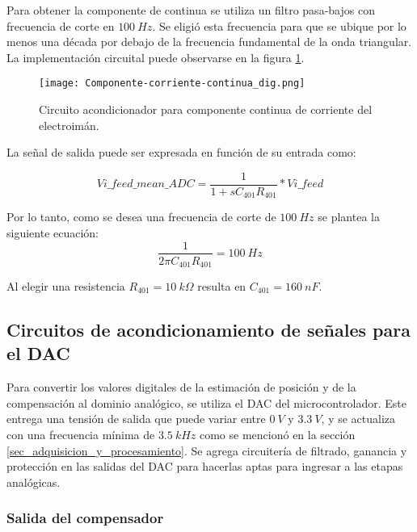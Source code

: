  Para obtener la componente de continua se utiliza un filtro pasa-bajos con frecuencia de corte en $100\:Hz$. Se eligió esta frecuencia para que se ubique por lo menos una década por debajo de la frecuencia fundamental de la onda triangular. La implementación circuital puede observarse en la figura \ref{fig:componente-corriente-continua}.


\begin{figure}[H]
	\centering
	\texttt{[image: Componente-corriente-continua\_dig.png]}
	\caption{Circuito acondicionador para componente continua de corriente del electroimán.
	}
	\label{fig:componente-corriente-continua}
\end{figure}

La señal de salida puede ser expresada en función de su entrada como:

\begin{equation*}
	Vi\_feed\_mean\_ADC=\frac{1}{1+sC_{401}R_{401}}*Vi\_feed
\end{equation*}

Por lo tanto, como se desea una frecuencia de corte de $100\:Hz$ se plantea la siguiente ecuación:
\begin{equation*} 
	\frac{1}{2\pi C_{401}R_{401}}=100\:Hz
\end{equation*}

Al elegir una resistencia $R_{401}=10\:k\Omega$ resulta en $C_{401}=160\:nF$.


\subsection{Circuitos de acondicionamiento de señales para el DAC}

 Para convertir los valores digitales de la estimación de posición y de la compensación al dominio analógico, se utiliza el DAC del microcontrolador. Este entrega una tensión de salida que puede variar entre $0\:V$ y $3.3\:V$, y se actualiza con una frecuencia mínima de $3.5\:kHz$ como se mencionó en la sección \ref{sec_adquisicion_y_procesamiento}. Se agrega circuitería de filtrado, ganancia y protección en las salidas del DAC para hacerlas aptas para ingresar a las etapas analógicas.
 
\subsubsection{Salida del compensador}

